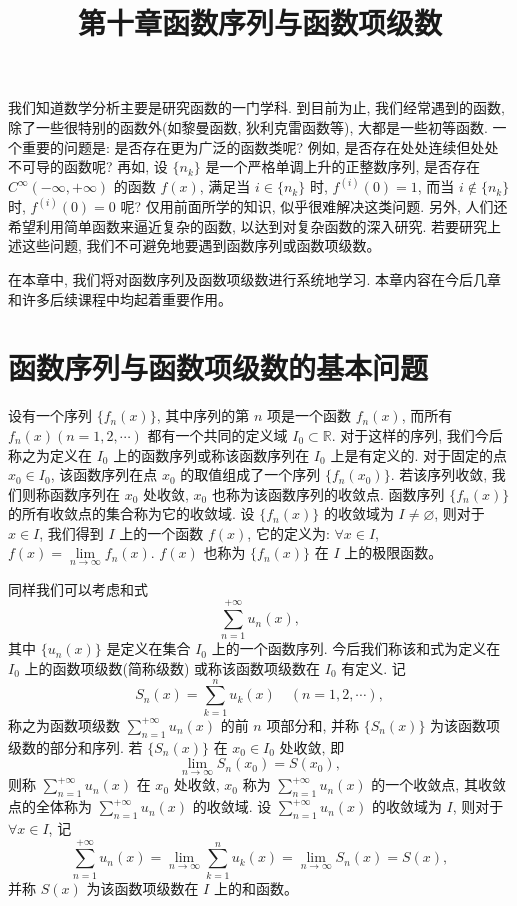 \documentclass[UTF8,12pt,a4paper,fontset=fandol]{ctexart}
\title{第十章\quad 函数序列与函数项级数}
\author{}
\date{}
\begin{document}
\maketitle

我们知道数学分析主要是研究函数的一门学科. 到目前为止, 我们经常遇到的函数, 除了一些很特别的函数外(如黎曼函数, 狄利克雷函数等), 大都是一些初等函数. 一个重要的问题是: 是否存在更为广泛的函数类呢? 例如, 是否存在处处连续但处处不可导的函数呢? 再如, 设 $\{n_k\}$ 是一个严格单调上升的正整数序列, 是否存在 $C^\infty(-\infty,+\infty)$ 的函数 $f(x)$, 满足当 $i\in\{n_k\}$ 时, $f^{(i)}(0)=1$, 而当 $i\notin\{n_k\}$ 时, $f^{(i)}(0)=0$ 呢? 仅用前面所学的知识, 似乎很难解决这类问题. 另外, 人们还希望利用简单函数来逼近复杂的函数, 以达到对复杂函数的深入研究. 若要研究上述这些问题, 我们不可避免地要遇到函数序列或函数项级数。

在本章中, 我们将对函数序列及函数项级数进行系统地学习. 本章内容在今后几章和许多后续课程中均起着重要作用。

\section{函数序列与函数项级数的基本问题}

设有一个序列 $\{f_n(x)\}$, 其中序列的第 $n$ 项是一个函数 $f_n(x)$, 而所有 $f_n(x)(n=1,2,\cdots)$ 都有一个共同的定义域 $I_0\subset\mathbb R$. 对于这样的序列, 我们今后称之为定义在 $I_0$ 上的函数序列或称该函数序列在 $I_0$ 上是有定义的. 对于固定的点 $x_0\in I_0$, 该函数序列在点 $x_0$ 的取值组成了一个序列 $\{f_n(x_0)\}$. 若该序列收敛, 我们则称函数序列在 $x_0$ 处收敛, $x_0$ 也称为该函数序列的收敛点. 函数序列 $\{f_n(x)\}$ 的所有收敛点的集合称为它的收敛域. 设 $\{f_n(x)\}$ 的收敛域为 $I\ne\varnothing$, 则对于 $x\in I$, 我们得到 $I$ 上的一个函数 $f(x)$, 它的定义为: $\forall x\in I$, $f(x)=\lim\limits_{n\to\infty}f_n(x)$. $f(x)$ 也称为 $\{f_n(x)\}$ 在 $I$ 上的极限函数。

同样我们可以考虑和式
\[
  \sum_{n=1}^{+\infty}u_n(x),
\]
其中 $\{u_n(x)\}$ 是定义在集合 $I_0$ 上的一个函数序列. 今后我们称该和式为定义在 $I_0$ 上的函数项级数(简称级数) 或称该函数项级数在 $I_0$ 有定义. 记
\[
  S_n(x)=\sum_{k=1}^n u_k(x)\quad(n=1,2,\cdots),
\]
称之为函数项级数 $\sum\limits_{n=1}^{+\infty}u_n(x)$ 的前 $n$ 项部分和, 并称 $\{S_n(x)\}$ 为该函数项级数的部分和序列. 若 $\{S_n(x)\}$ 在 $x_0\in I_0$ 处收敛, 即
\[
  \lim_{n\to\infty}S_n(x_0)=S(x_0),
\]
则称 $\sum\limits_{n=1}^{+\infty}u_n(x)$ 在 $x_0$ 处收敛, $x_0$ 称为 $\sum\limits_{n=1}^{+\infty}u_n(x)$ 的一个收敛点, 其收敛点的全体称为 $\sum\limits_{n=1}^{+\infty}u_n(x)$ 的收敛域. 设 $\sum\limits_{n=1}^{+\infty}u_n(x)$ 的收敛域为 $I$, 则对于 $\forall x\in I$, 记
\[
  \sum_{n=1}^{+\infty}u_n(x)=\lim_{n\to\infty}\sum_{k=1}^n u_k(x)=\lim_{n\to\infty}S_n(x)=S(x),
\]
并称 $S(x)$ 为该函数项级数在 $I$ 上的和函数。
\end{document}
